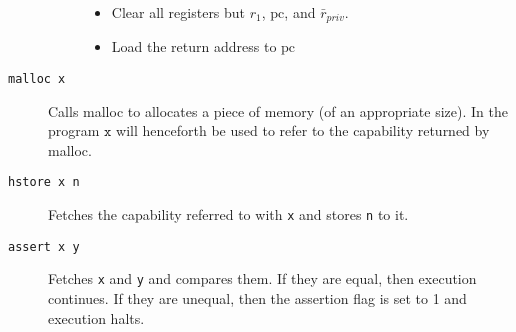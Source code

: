 \documentclass[a4paper]{article}
\newcommand{\var}[1]{\mathit{#1}}
\newcommand{\pcreg}{\mathrm{pc}}
\begin{document}
\begin{description}
\begin{description}
\begin{itemize}
    \item Clear all registers but $r_1$, $\pcreg$, and $\bar{r}_{\var{priv}}$.
    \item Load the return address to $\pcreg$
    \end{itemize}
\end{description}
\item[\texttt{malloc x}] Calls malloc to allocates a piece of memory (of an appropriate size). In the program $\texttt{x}$ will henceforth be used to refer to the capability returned by malloc.
\item[\texttt{hstore x n}] Fetches the capability referred to with \texttt{x} and stores \texttt{n} to it.
\item[\texttt{assert x y}] Fetches \texttt{x} and \texttt{y} and compares them. If they are equal, then execution continues. If they are unequal, then the assertion flag is set to 1 and execution halts.
\end{description}
\end{document}
